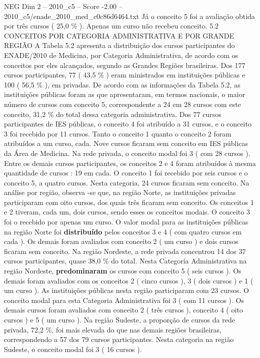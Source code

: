 \begin{textsample}{NEG Dim 2 – 2010\_c5 – Score -2.00 – 2010\_c5/enade\_2010\_med\_c0c86d6464.txt}
Já o conceito 5 foi a avaliação obtida por três cursos ( 25,0 \% ).
Apenas um curso não recebeu conceito. 5.2 CONCEITOS POR CATEGORIA ADMINISTRATIVA E POR GRANDE REGIÃO A Tabela 5.2 apresenta a distribuição dos cursos participantes do ENADE/2010 de Medicina, por Categoria Administrativa, de acordo com os conceitos por eles alcançados, segundo as Grandes Regiões brasileiras.
Dos 177 cursos participantes, 77 ( 43,5 \% ) eram ministrados em instituições públicas e 100 ( 56,5 \% ), em privadas.
De acordo com as informações da Tabela 5.2, as instituições públicas foram as que apresentaram, em termos nacionais, o maior número de cursos com conceito 5, correspondente a 24 em 28 cursos com este conceito, 31,2 \% do total dessa categoria administrativa.
Dos 77 cursos participantes de IES públicas, o conceito 4 foi atribuído a 31 cursos, e o conceito 3 foi recebido por 11 cursos.
Tanto o conceito 1 quanto o conceito 2 foram atribuídos a um curso, cada.
Nove cursos ficaram sem conceito em IES públicas da Área de Medicina.
Na rede privada, o conceito modal foi 3 ( com 28 cursos ).
Entre os demais cursos participantes, os conceitos 2 e 4 foram atribuídos à mesma quantidade de cursos : 19 em cada.
O conceito 1 foi recebido por seis cursos e o conceito 5, a quatro cursos.
Nesta categoria, 24 cursos ficaram sem conceito.
Na análise por região, observa -se que, na região Norte, as instituições privadas participaram com oito cursos, dos quais três ficaram sem conceito.
Os conceitos 1 e 2 tiveram, cada um, dois cursos, sendo esses os conceitos modais.
O conceito 3 foi o recebido por apenas um curso.
O valor modal para as instituições públicas na região Norte foi \textbf{distribuído} pelos conceitos 3 e 4 ( com quatro cursos em cada ).
Os demais foram avaliados com conceito 2 ( um curso ) e dois cursos ficaram sem conceito.
Na região Nordeste, a rede privada concentrou 14 dos 37 cursos participantes, quase 38,0 \% do total.
Nesta Categoria Administrativa na região Nordeste, \textbf{predominaram} os cursos com conceito 5 ( seis cursos ).
Os demais foram avaliados com os conceitos 2 ( cinco cursos ), 3 ( dois cursos ) e 1 ( um curso ).
As instituições públicas nesta região participaram com 23 cursos.
O conceito modal para esta Categoria Administrativa foi 3 ( com 11 cursos ).
Os demais cursos foram avaliados com conceito 2 ( três cursos ), conceito 4 ( oito cursos ) e 5 ( um curso ).
Na região Sudeste, a proporção de cursos da rede privada, 72,2 \%, foi mais elevada do que nas demais regiões brasileiras, correspondendo a 57 dos 79 cursos participantes.
Nesta categoria na região Sudeste, o conceito modal foi 3 ( 16 cursos ).

\end{textsample}
